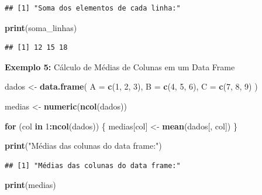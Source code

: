 \documentclass[
]{book}
\newenvironment{Shaded}{\begin{snugshade}}{\end{snugshade}}
\newcommand{\AttributeTok}[1]{\textcolor[rgb]{0.13,0.29,0.53}{#1}}
\newcommand{\ControlFlowTok}[1]{\textcolor[rgb]{0.13,0.29,0.53}{\textbf{#1}}}
\newcommand{\DecValTok}[1]{\textcolor[rgb]{0.00,0.00,0.81}{#1}}
\newcommand{\FunctionTok}[1]{\textcolor[rgb]{0.13,0.29,0.53}{\textbf{#1}}}
\newcommand{\NormalTok}[1]{#1}
\newcommand{\OtherTok}[1]{\textcolor[rgb]{0.56,0.35,0.01}{#1}}
\newcommand{\SpecialCharTok}[1]{\textcolor[rgb]{0.81,0.36,0.00}{\textbf{#1}}}
\newcommand{\StringTok}[1]{\textcolor[rgb]{0.31,0.60,0.02}{#1}}
\begin{document}
\begin{verbatim}
## [1] "Soma dos elementos de cada linha:"
\end{verbatim}

\begin{Shaded}
\begin{Highlighting}[]
\FunctionTok{print}\NormalTok{(soma\_linhas)}
\end{Highlighting}
\end{Shaded}

\begin{verbatim}
## [1] 12 15 18
\end{verbatim}

\textbf{Exemplo 5:} Cálculo de Médias de Colunas em um Data Frame

\begin{Shaded}
\begin{Highlighting}[]
\NormalTok{dados }\OtherTok{\textless{}{-}} \FunctionTok{data.frame}\NormalTok{(}
\AttributeTok{A =} \FunctionTok{c}\NormalTok{(}\DecValTok{1}\NormalTok{, }\DecValTok{2}\NormalTok{, }\DecValTok{3}\NormalTok{),}
\AttributeTok{B =} \FunctionTok{c}\NormalTok{(}\DecValTok{4}\NormalTok{, }\DecValTok{5}\NormalTok{, }\DecValTok{6}\NormalTok{),}
\AttributeTok{C =} \FunctionTok{c}\NormalTok{(}\DecValTok{7}\NormalTok{, }\DecValTok{8}\NormalTok{, }\DecValTok{9}\NormalTok{)}
\NormalTok{)}

\NormalTok{medias }\OtherTok{\textless{}{-}} \FunctionTok{numeric}\NormalTok{(}\FunctionTok{ncol}\NormalTok{(dados))}

\ControlFlowTok{for}\NormalTok{ (col }\ControlFlowTok{in} \DecValTok{1}\SpecialCharTok{:}\FunctionTok{ncol}\NormalTok{(dados)) \{}
\NormalTok{  medias[col] }\OtherTok{\textless{}{-}} \FunctionTok{mean}\NormalTok{(dados[, col])}
\NormalTok{\}}

\FunctionTok{print}\NormalTok{(}\StringTok{"Médias das colunas do data frame:"}\NormalTok{)}
\end{Highlighting}
\end{Shaded}

\begin{verbatim}
## [1] "Médias das colunas do data frame:"
\end{verbatim}

\begin{Shaded}
\begin{Highlighting}[]
\FunctionTok{print}\NormalTok{(medias)}
\end{Highlighting}
\end{Shaded}
\end{document}
